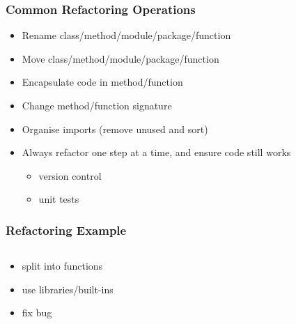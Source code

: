 \documentclass{beamer}
\begin{document}

\begin{frame}
 \frametitle{Common Refactoring Operations}

\begin{itemize}
  \item Rename class/method/module/package/function
  \item Move class/method/module/package/function
  \item Encapsulate code in method/function
  \item Change method/function signature
  \item Organise imports (remove unused and sort)
\end{itemize}

\begin{itemize}
  \item Always refactor one step at a time, and ensure code still works
\begin{itemize}
\item version control
\item unit tests
\end{itemize}
\end{itemize}
  
\end{frame}


\begin{frame}
 \frametitle{Refactoring Example}

\begin{columns}[T]
\vspace*{5cm}


\end{columns}

\begin{itemize}
 \item<2> split into functions
 \item<3-> use libraries/built-ins
 \item<4-> fix bug
\end{itemize}


\end{frame}

\end{document}

